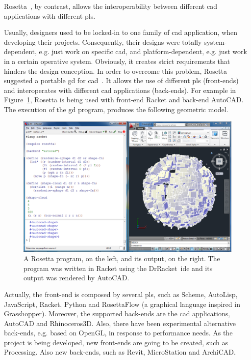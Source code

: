 Rosetta~\cite{lopes2011portable}, by contrast, allows the interoperability between different \ac{cad} applications with different \ac{pl}s. 

Usually, designers used to be locked-in to one family of \ac{cad} application, when developing their projects. Consequently, their designs were totally system-dependent, e.g. just work on specific \ac{cad}, and platform-dependent, e.g. just work in a certain operative system. Obviously, it creates strict requirements that hinders the design conception. In order to overcome this problem, Rosetta suggested a portable \ac{gd} for \ac{cad}~\cite{lopes2011portable}. It allows the use of different \ac{pl}s (front-ends) and interoperates with different \ac{cad} applications (back-ends). For example in Figure~\ref{fig:rosetta1}, Rosetta is being used with front-end Racket and back-end AutoCAD. The execution of the \ac{gd} program, produces the following geometric model.

\begin{figure}[h]
  \centering
  \includegraphics[scale=0.2]{img/rosetta1}
    \caption{A Rosetta program, on the left, and its output, on the right. The program was written in Racket using the DrRacket~\ac{ide} and its output was rendered by AutoCAD.}  
  \label{fig:rosetta1}
\end{figure} 

Actually, the front-end is composed by several \ac{pl}s, such as Scheme, AutoLisp, JavaScript, Racket, Python and RosettaFlow (a graphical language inspired in Grasshopper). Moreover, the supported back-ends are the \ac{cad} applications, AutoCAD and Rhinoceros3D. Also, there have been experimental alternative back-ends, e.g. based on OpenGL, in response to performance needs. As the project is being developed, new front-ends are going to be created, such as Processing. Also new back-ends, such as Revit, MicroStation and ArchiCAD.

